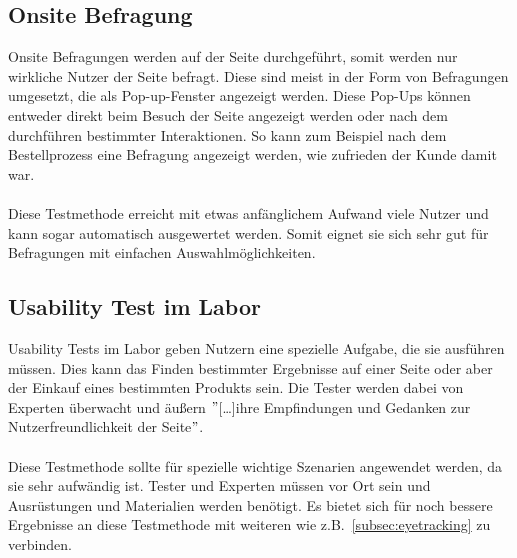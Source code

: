 \subsection{Onsite Befragung}
Onsite Befragungen werden auf der Seite durchgeführt, somit werden nur wirkliche Nutzer der Seite befragt.
Diese sind meist in der Form von Befragungen umgesetzt, die als Pop-up-Fenster angezeigt werden.
Diese Pop-Ups können entweder direkt beim Besuch der Seite angezeigt werden oder nach dem durchführen bestimmter Interaktionen.
So kann zum Beispiel nach dem Bestellprozess eine Befragung angezeigt werden, wie zufrieden der Kunde damit war.\autocite[vgl.~][]{usability.de.methods}\\\\
Diese Testmethode erreicht mit etwas anfänglichem Aufwand viele Nutzer und kann sogar automatisch ausgewertet werden.
Somit eignet sie sich sehr gut für Befragungen mit einfachen Auswahlmöglichkeiten.\autocite[vgl.~][]{usability.de.onsite}

\subsection{Usability Test im Labor}
Usability Tests im Labor geben Nutzern eine spezielle Aufgabe, die sie ausführen müssen.
Dies kann das Finden bestimmter Ergebnisse auf einer Seite oder aber der Einkauf eines bestimmten Produkts sein.
Die Tester werden dabei von Experten überwacht und äußern \("\)[\ldots]ihre Empfindungen und Gedanken zur Nutzerfreundlichkeit der Seite\("\)\autocite{mso.usability}.\\\\
Diese Testmethode sollte für spezielle wichtige Szenarien angewendet werden, da sie sehr aufwändig ist.
Tester und Experten müssen vor Ort sein und Ausrüstungen und Materialien werden benötigt.
Es bietet sich für noch bessere Ergebnisse an diese Testmethode mit weiteren wie z.B.~\ref{subsec:eyetracking} zu verbinden.